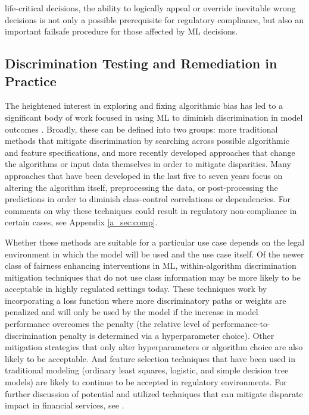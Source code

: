 \documentclass[information,article,submit,moreauthors,pdftex]{definitions/mdpi}
\begin{document}
life-critical decisions, the ability to logically appeal or override inevitable wrong decisions is not only a possible prerequisite for regulatory compliance, but also an important failsafe procedure for those affected by ML decisions.  

\subsection{Discrimination Testing and Remediation in Practice}\label{ssec:disc_rem}

The heightened interest in exploring and fixing algorithmic bias has led to a significant body of work focused in using ML to diminish discrimination in model outcomes \cite{friedler2019comparative}. Broadly, these can be defined into two groups: more traditional methods that mitigate discrimination by searching across possible algorithmic and feature specifications, and more recently developed approaches that change the algorithms or input data themselves in order to mitigate disparities. Many approaches that have been developed in the last five to seven years focus on altering the algorithm itself, preprocessing the data, or post-processing the predictions in order to diminish class-control correlations or dependencies. For comments on why these techniques could result in regulatory non-compliance in certain cases, see Appendix \ref{a_sec:comp}.

Whether these methods are suitable for a particular use case depends on the legal environment in which the model will be used and the use case itself. Of the newer class of fairness enhancing interventions in ML, within-algorithm discrimination mitigation techniques that do not use class information may be more likely to be acceptable in highly regulated settings today. These techniques work by incorporating a loss function where more discriminatory paths or weights are penalized and will only be used by the model if the increase in model performance overcomes the penalty (the relative level of performance-to-discrimination penalty is determined via a hyperparameter choice). Other mitigation strategies that only alter hyperparameters or algorithm choice are also likely to be acceptable. And feature selection techniques that have been used in traditional modeling (ordinary least squares, logistic, and simple decision tree models) are likely to continue to be accepted in regulatory environments.  For further discussion of potential and utilized techniques that can mitigate disparate impact in financial services, see \citet{schmidt2019introduction}. 
\end{document}
